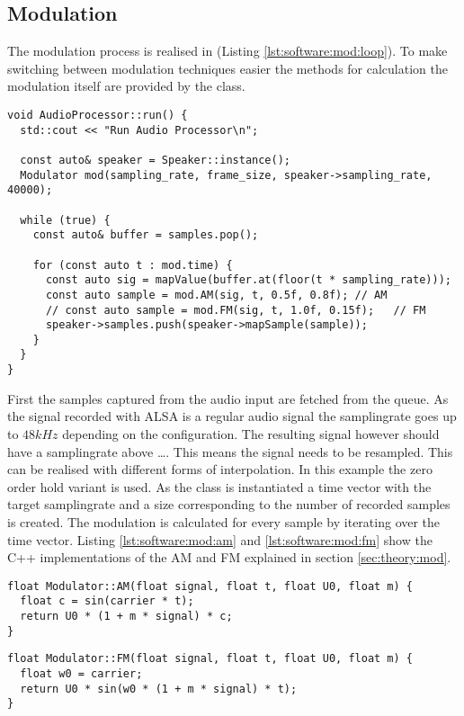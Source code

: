 \subsection{Modulation}
%
The modulation process is realised in  (Listing \ref{lst:software:mod:loop}). To make switching between modulation techniques easier the methods for calculation the modulation itself are provided by the  class.\p
%
\begin{mdframed}
\begin{lstlisting}[caption=Audio processing loop, label=lst:software:mod:loop]
void AudioProcessor::run() {
  std::cout << "Run Audio Processor\n";

  const auto& speaker = Speaker::instance();
  Modulator mod(sampling_rate, frame_size, speaker->sampling_rate, 40000);

  while (true) {
    const auto& buffer = samples.pop();

    for (const auto t : mod.time) {
      const auto sig = mapValue(buffer.at(floor(t * sampling_rate)));
      const auto sample = mod.AM(sig, t, 0.5f, 0.8f); // AM
      // const auto sample = mod.FM(sig, t, 1.0f, 0.15f);   // FM
      speaker->samples.push(speaker->mapSample(sample));
    }
  }
}
\end{lstlisting}
\end{mdframed}
%
First the samples captured from the audio input are fetched from the  queue. As the signal recorded with ALSA is a regular audio signal the samplingrate goes up to $48kHz$ depending on the configuration. The resulting signal however should have a samplingrate above \dots. This means the signal needs to be resampled. This can be realised with different forms of interpolation. In this example the zero order hold variant is used.\p
%
As the  class is instantiated a time vector with the target samplingrate and a size corresponding to the number of recorded samples is created. The modulation is calculated for every sample by iterating over the time vector.\p
%
Listing \ref{lst:software:mod:am} and \ref{lst:software:mod:fm} show the C++ implementations of the AM and FM explained in section \ref{sec:theory:mod}.
%
\begin{mdframed}
\begin{lstlisting}[caption=Amplitude modulation, label=lst:software:mod:am]
float Modulator::AM(float signal, float t, float U0, float m) {
  float c = sin(carrier * t);
  return U0 * (1 + m * signal) * c;
}
\end{lstlisting}
\end{mdframed}
%
\begin{mdframed}
\begin{lstlisting}[caption=Frequency modulation, label=lst:software:mod:fm]
float Modulator::FM(float signal, float t, float U0, float m) {
  float w0 = carrier;
  return U0 * sin(w0 * (1 + m * signal) * t);
}
\end{lstlisting}
\end{mdframed}